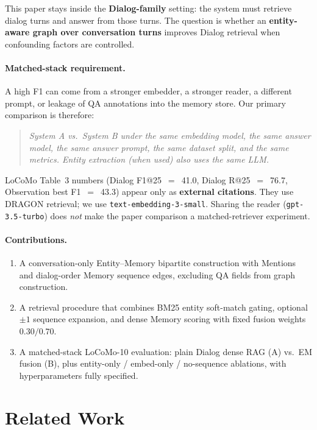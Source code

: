 \documentclass[11pt]{article}
\begin{document}
This paper stays inside the \textbf{Dialog-family} setting: the system must retrieve dialog turns and answer from those turns.
The question is whether an \textbf{entity-aware graph over conversation turns} improves Dialog retrieval when confounding factors are controlled.

\paragraph{Matched-stack requirement.}
A high F1 can come from a stronger embedder, a stronger reader, a different prompt, or leakage of QA annotations into the memory store.
Our primary comparison is therefore:

\begin{quote}
\textit{System A vs.\ System B under the same embedding model, the same answer model, the same answer prompt, the same dataset split, and the same metrics.
Entity extraction (when used) also uses the same LLM.}
\end{quote}

LoCoMo Table~3 numbers (Dialog F1@25~$=$~41.0, Dialog R@25~$=$~76.7, Observation best F1~$=$~43.3) appear only as \textbf{external citations}.
They use DRAGON retrieval; we use \texttt{text-embedding-3-small}.
Sharing the reader (\texttt{gpt-3.5-turbo}) does \emph{not} make the paper comparison a matched-retriever experiment.

\paragraph{Contributions.}
\begin{enumerate}[leftmargin=*,itemsep=2pt]
  \item A conversation-only Entity--Memory bipartite construction with Mentions and dialog-order Memory sequence edges, excluding QA fields from graph construction.
  \item A retrieval procedure that combines BM25 entity soft-match gating, optional $\pm 1$ sequence expansion, and dense Memory scoring with fixed fusion weights $0.30/0.70$.
  \item A matched-stack LoCoMo-10 evaluation: plain Dialog dense RAG (A) vs.\ EM fusion (B), plus entity-only / embed-only / no-sequence ablations, with hyperparameters fully specified.
\end{enumerate}

\section{Related Work}
\label{sec:related}
\end{document}
